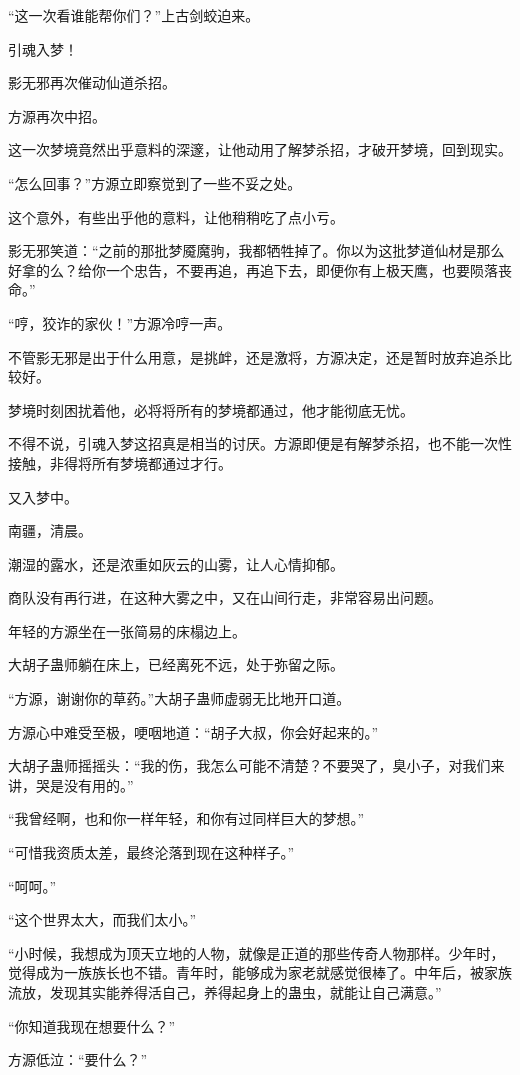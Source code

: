 \begin{this_body}
“这一次看谁能帮你们？”上古剑蛟迫来。

引魂入梦！

影无邪再次催动仙道杀招。

方源再次中招。

这一次梦境竟然出乎意料的深邃，让他动用了解梦杀招，才破开梦境，回到现实。

“怎么回事？”方源立即察觉到了一些不妥之处。

这个意外，有些出乎他的意料，让他稍稍吃了点小亏。

影无邪笑道：“之前的那批梦魇魔驹，我都牺牲掉了。你以为这批梦道仙材是那么好拿的么？给你一个忠告，不要再追，再追下去，即便你有上极天鹰，也要陨落丧命。”

“哼，狡诈的家伙！”方源冷哼一声。

不管影无邪是出于什么用意，是挑衅，还是激将，方源决定，还是暂时放弃追杀比较好。

梦境时刻困扰着他，必将将所有的梦境都通过，他才能彻底无忧。

不得不说，引魂入梦这招真是相当的讨厌。方源即便是有解梦杀招，也不能一次性接触，非得将所有梦境都通过才行。

又入梦中。

南疆，清晨。

潮湿的露水，还是浓重如灰云的山雾，让人心情抑郁。

商队没有再行进，在这种大雾之中，又在山间行走，非常容易出问题。

年轻的方源坐在一张简易的床榻边上。

大胡子蛊师躺在床上，已经离死不远，处于弥留之际。

“方源，谢谢你的草药。”大胡子蛊师虚弱无比地开口道。

方源心中难受至极，哽咽地道：“胡子大叔，你会好起来的。”

大胡子蛊师摇摇头：“我的伤，我怎么可能不清楚？不要哭了，臭小子，对我们来讲，哭是没有用的。”

“我曾经啊，也和你一样年轻，和你有过同样巨大的梦想。”

“可惜我资质太差，最终沦落到现在这种样子。”

“呵呵。”

“这个世界太大，而我们太小。”

“小时候，我想成为顶天立地的人物，就像是正道的那些传奇人物那样。少年时，觉得成为一族族长也不错。青年时，能够成为家老就感觉很棒了。中年后，被家族流放，发现其实能养得活自己，养得起身上的蛊虫，就能让自己满意。”

“你知道我现在想要什么？”

方源低泣：“要什么？”


\end{this_body}
